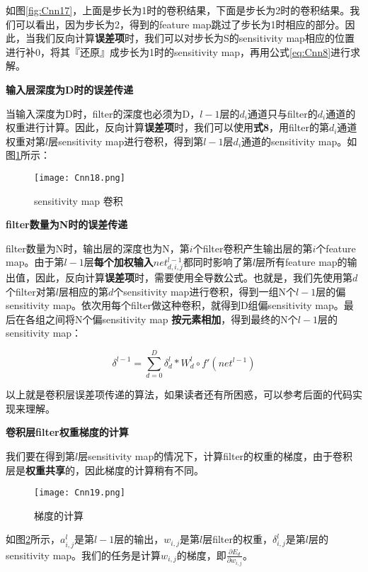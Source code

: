 如图\ref{fig:Cnn17}，上面是步长为1时的卷积结果，下面是步长为2时的卷积结果。我们可以看出，因为步长为2，得到的feature map跳过了步长为1时相应的部分。因此，当我们反向计算\textbf{误差项}时，我们可以对步长为S的sensitivity map相应的位置进行补0，将其『还原』成步长为1时的sensitivity map，再用公式\ref{eq:Cnn8}进行求解。

\textbf{输入层深度为D时的误差传递}

当输入深度为D时，filter的深度也必须为D，\(l-1\)层的\(d_i\)通道只与filter的\(d_i\)通道的权重进行计算。因此，反向计算\textbf{误差项}时，我们可以使用\textbf{式8}，用filter的第\(d_i\)通道权重对第\(l\)层sensitivity map进行卷积，得到第\(l-1\)层\(d_i\)通道的sensitivity map。如图\ref{fig:Cnn18}所示：

\begin{figure}[!h]
	\centering
	\texttt{[image: Cnn18.png]}
	\caption{sensitivity map 卷积}
	\label{fig:Cnn18}
\end{figure}

\textbf{filter数量为N时的误差传递}

filter数量为N时，输出层的深度也为N，第\(i\)个filter卷积产生输出层的第\(i\)个feature map。由于第\(l-1\)层\textbf{每个加权输入}\(net^{l-1}_{d, i,j}\)都同时影响了第\(l\)层所有feature map的输出值，因此，反向计算\textbf{误差项}时，需要使用全导数公式。也就是，我们先使用第\(d\)个filter对第\(l\)层相应的第\(d\)个sensitivity map进行卷积，得到一组N个\(l-1\)层的偏sensitivity map。依次用每个filter做这种卷积，就得到D组偏sensitivity map。最后在各组之间将N个偏sensitivity map
\textbf{按元素相加}，得到最终的N个\(l-1\)层的sensitivity map：

\begin{equation}
	\label{eq:Cnn9}
	\delta^{l-1}=\sum_{d=0}^D\delta_d^l*W_d^l\circ f'(net^{l-1})
\end{equation}

以上就是卷积层误差项传递的算法，如果读者还有所困惑，可以参考后面的代码实现来理解。

\textbf{卷积层filter权重梯度的计算}

我们要在得到第\(l\)层sensitivity map的情况下，计算filter的权重的梯度，由于卷积层是\textbf{权重共享}的，因此梯度的计算稍有不同。

\begin{figure}[!h]
	\centering
	\texttt{[image: Cnn19.png]}
	\caption{梯度的计算}
	\label{fig:Cnn19}
\end{figure}

如图\ref{fig:Cnn19}所示，\(a^l_{i,j}\)是第\(l-1\)层的输出，\(w_{i,j}\)是第\(l\)层filter的权重，\(\delta^l_{i,j}\)是第\(l\)层的sensitivity map。我们的任务是计算\(w_{i,j}\)的梯度，即\(\frac{\partial{E_d}}{\partial{w_{i,j}}}\)。

